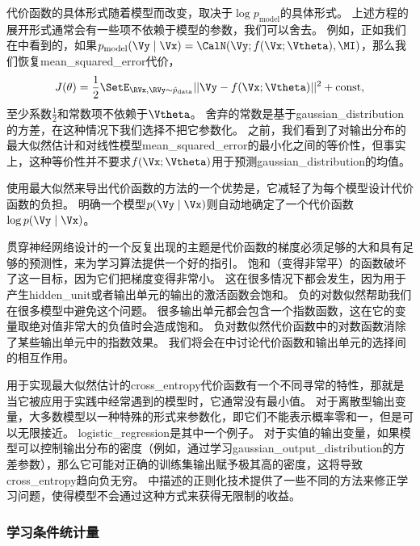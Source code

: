 代价函数的具体形式随着模型而改变，取决于$\log p_\text{model}$的具体形式。
上述方程的展开形式通常会有一些项不依赖于模型的参数，我们可以舍去。
例如，正如我们在中看到的，如果$p_\text{model}(\Vy\mid\Vx) = \CalN(\Vy;f(\Vx;\Vtheta), \MI)$，那么我们恢复\gls{mean_squared_error}代价，
\begin{equation}
J(\theta) = \frac{1}{2} \SetE_{\RVx, \RVy \sim  \hat{p}_\text{data}} || \Vy - f(\Vx; \Vtheta) ||^2 + \text{const},
\end{equation}
至少系数$\frac{1}{2}$和常数项不依赖于$\Vtheta$。
舍弃的常数是基于\gls{gaussian_distribution}的方差，在这种情况下我们选择不把它参数化。
之前，我们看到了对输出分布的最大似然估计和对线性模型\gls{mean_squared_error}的最小化之间的等价性，但事实上，这种等价性并不要求$f(\Vx; \Vtheta)$用于预测\gls{gaussian_distribution}的均值。

使用最大似然来导出代价函数的方法的一个优势是，它减轻了为每个模型设计代价函数的负担。
明确一个模型$p(\Vy\mid\Vx)$则自动地确定了一个代价函数$\log p(\Vy\mid\Vx)$。

贯穿神经网络设计的一个反复出现的主题是代价函数的梯度必须足够的大和具有足够的预测性，来为学习算法提供一个好的指引。
饱和（变得非常平）的函数破坏了这一目标，因为它们把梯度变得非常小。
这在很多情况下都会发生，因为用于产生\gls{hidden_unit}或者输出单元的输出的激活函数会饱和。
负的对数似然帮助我们在很多模型中避免这个问题。
很多输出单元都会包含一个指数函数，这在它的变量取绝对值非常大的负值时会造成饱和。
负对数似然代价函数中的对数函数消除了某些输出单元中的指数效果。
我们将会在中讨论代价函数和输出单元的选择间的相互作用。


用于实现最大似然估计的\gls{cross_entropy}代价函数有一个不同寻常的特性，那就是当它被应用于实践中经常遇到的模型时，它通常没有最小值。
对于离散型输出变量，大多数模型以一种特殊的形式来参数化，即它们不能表示概率零和一，但是可以无限接近。
\gls{logistic_regression}是其中一个例子。
对于实值的输出变量，如果模型可以控制输出分布的密度（例如，通过学习\gls{gaussian_output_distribution}的方差参数），那么它可能对正确的训练集输出赋予极其高的密度，这将导致\gls{cross_entropy}趋向负无穷。
中描述的正则化技术提供了一些不同的方法来修正学习问题，使得模型不会通过这种方式来获得无限制的收益。

\subsubsection{学习条件统计量}
\label{sec:learning_conditional_statistics}

